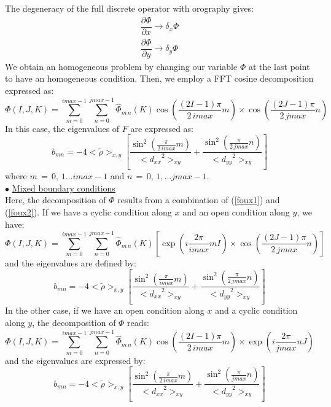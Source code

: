 The degeneracy of the full discrete operator with orography gives:
\begin{eqnarray*}
\dfrac{\partial \Phi}{\partial x} \rightarrow \delta _x \Phi \\
\dfrac{\partial \Phi}{\partial y} \rightarrow \delta _y \Phi
\end{eqnarray*}
We obtain an homogeneous problem by changing our variable $\Phi$ at the last
point to have an homogeneous condition.
 Then, we employ a FFT cosine decomposition expressed as:
\begin{equation}
\label{foux2}
\Phi (I, J, K) =    \sum_{m=0}^{imax-1} \sum_{n=0}^{jmax-1}
\widehat{\Phi}_{m \, n}(K)
\cos \left( \dfrac {(2I - 1) \pi}{2 \, imax} m\right) \times
\cos \left( \dfrac {(2J - 1) \pi}{2 \, jmax} n\right)
\end{equation}
In this case, the eigenvalues of $F$ are expressed as:
\begin{displaymath}
b_{mn} = - 4 <\tilde{\rho}>_{x,y} \left[
\dfrac{\sin ^2 \left( \frac { \pi} {2 \, imax}  m\right)} {<{d_{xx}}^2>_{xy}}
+
\dfrac{\sin ^2 \left( \frac { \pi} {2 \, jmax}  n\right)} {<{d_{yy}}^2>_{xy}}
\right]
\end{displaymath}
where $m\,=\,0, \, 1...imax-1$ and $n\,=\,0,\, 1,...jmax-1$.\\
$\bullet$  \underline{Mixed boundary conditions}\\
Here, the decomposition of $\Phi$ results from a combination of (\ref{foux1})
and (\ref{foux2}). If we have a cyclic condition along $x$ and an open
condition along $y$, we have:
\begin{equation}
\Phi (I, J, K) =   \sum_{m=0}^{imax-1} \sum_{n=0}^{jmax-1}
\widehat{\Phi}_{m\, n}(K)
\left[ \exp \left( i\frac {2\pi}{imax} m I \right) \times
\cos \left( \dfrac {(2J - 1) \pi}{2 \, jmax} n\right) \right]
\end{equation}
and the eigenvalues are defined by:
\begin{equation}
b_{mn} = - 4 < \tilde{\rho} >_{x,y} \left[
\dfrac{\sin ^2 \left( \frac {\pi} {imax} m \right)} {<{d_{xx}}^2>_{xy}} +
\dfrac{\sin ^2 \left( \frac {\pi} {2 \, jmax}  n\right)} {<{d_{yy}}^2>_{xy}}
\right]
\end{equation}
In the other case, if we have an open condition along $x$ and a cyclic
condition along $y$, the decomposition of $\Phi$ reads:
\begin{equation}
\Phi (I, J, K) =   \sum_{m=0}^{imax-1} \sum_{n=0}^{jmax-1}
\widehat{\Phi}_{m\, n}(K)
\cos \left( \dfrac {(2I - 1) \pi}{2 \, imax} m\right) \times
\exp \left( i\frac {2\pi}{jmax} n J \right)
\end{equation}
and the eigenvalues are expressed by:
\begin{equation}
b_{mn} = - 4 < \tilde{\rho} >_{x,y} \left[
\dfrac{\sin ^2 \left( \frac { \pi} {2 \, imax}  m\right)} {<{d_{xx}}^2>_{xy}}
 +
\dfrac{\sin ^2 \left( \frac { \pi} {jmax}  n\right)} {<{d_{yy}}^2>_{xy}}
 \right]
\end{equation}
